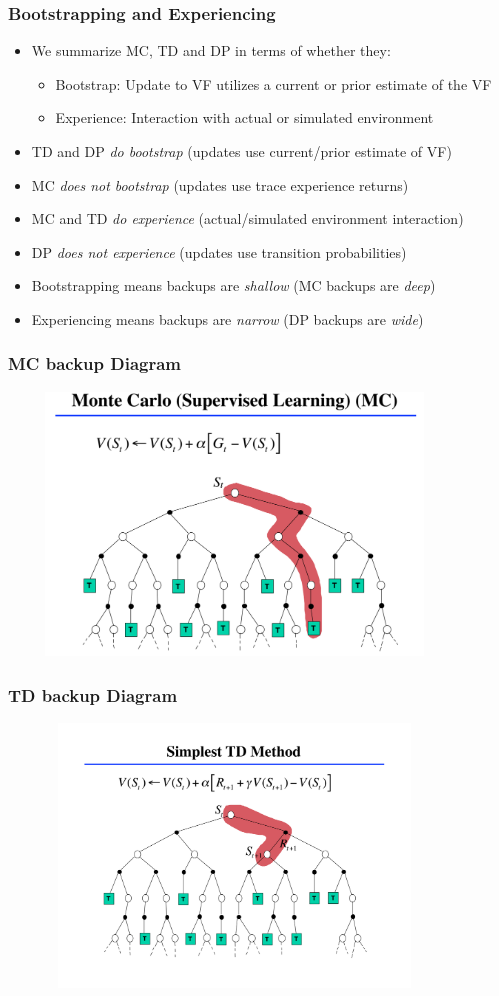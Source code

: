 \documentclass[handout]{beamer}
\begin{document}
\begin{frame}
\frametitle{Bootstrapping and Experiencing}
\pause
\begin{itemize}[<+->]
\item We summarize MC, TD and DP in terms of whether they:
\begin{itemize}[<+->]
\item Bootstrap:  Update to VF utilizes a current or prior estimate of the VF
\item Experience: Interaction with actual or simulated environment
\end{itemize}
\item TD and DP {\em do bootstrap} (updates use current/prior estimate of VF)
\item MC {\em does not bootstrap} (updates use trace experience returns)
\item MC and TD {\em do experience} (actual/simulated environment interaction)
\item DP {\em does not experience} (updates use transition probabilities)
\item Bootstrapping means backups are {\em shallow} (MC backups are {\em deep})
\item Experiencing means backups are {\em narrow} (DP backups are {\em wide})
\end{itemize}
\end{frame}


\begin{frame}
\frametitle{MC backup Diagram}
\includegraphics[width=12cm, height=7cm]{mc_backup.png}
\end{frame}

\begin{frame}
\frametitle{TD backup Diagram}
\includegraphics[width=12cm, height=7cm]{td_backup.png}
\end{frame}
\end{document}
